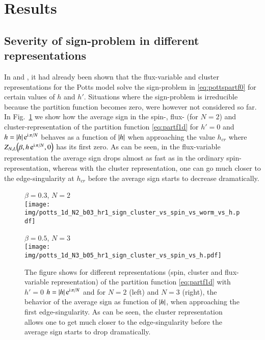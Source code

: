 \documentclass[epj]{webofc}
\let\originalleft\left
\let\originalright\right
\renewcommand{\left}{\mathopen{}\mathclose\bgroup\originalleft}
\renewcommand{\right}{\aftergroup\egroup\originalright}
\newcommand{\e}{\operatorname{e}}
\newcommand{\of}[1]{\left(#1\right)}
\newcommand{\ii}{\mathrm{i}}
\newcommand{\abs}[1]{\left| #1\right|}
\renewcommand*\[{\begin{equation}}
\renewcommand*\]{\end{equation}}
\begin{document}
\section{Results}\label{sec:results}

\subsection{Severity of sign-problem in different representations}\label{ssec:severityofsignproblem}
In \cite{Akerlund:2016myr} and \cite{Alford:2001ug}, it had already been shown that the flux-variable and cluster representations for the Potts model solve the sign-problem in \eqref{eq:pottspartf0} for certain values of $h$ and $h'$. Situations where the sign-problem is irreducible because the partition function becomes zero, were however not considered so far. In Fig.~\ref{fig:signproblemdiffrep1d} we show how the average sign in the spin-, flux- (for $N=2$) and cluster-representation of the partition function \eqref{eq:partf1d} for $h'=0$ and $h=\abs{h}\e^{\ii\,\pi/N}$ behaves as a function of $\abs{h}$ when approaching the value $h_{cr}$ where $Z_{N,L}\of{\beta,h\e^{\ii\,\pi/N},0}$ has its first zero. As can be seen, in the flux-variable representation the average sign drops almost as fast as in the ordinary spin-representation, whereas with the cluster representation, one can go much closer to the edge-singularity at $h_{cr}$ before the average sign starts to decrease dramatically.

\begin{figure}[h]
\centering
\begin{minipage}[t]{0.45\linewidth}
\centering
$\beta=0.3$, $N=2$\\[-5pt]
\texttt{[image: img/potts\_1d\_N2\_b03\_hr1\_sign\_cluster\_vs\_spin\_vs\_worm\_vs\_h.pdf]}
\end{minipage}\hfill
\begin{minipage}[t]{0.45\linewidth}
\centering
$\beta=0.5$, $N=3$\\[-5pt]
\texttt{[image: img/potts\_1d\_N3\_b05\_hr1\_sign\_cluster\_vs\_spin\_vs\_h.pdf]}
\end{minipage}
\caption{The figure shows for different representations (spin, cluster and flux-variable representation) of the partition function \eqref{eq:partf1d} with $h'=0$ $h=\abs{h}\e^{\ii\,\pi/N}$ and for $N=2$ (left) and $N=3$ (right), the behavior of the average sign as function of $\abs{h}$, when approaching the first edge-singularity. As can be seen, the cluster representation allows one to get much closer to the edge-singularity before the average sign starts to drop dramatically.}
\label{fig:signproblemdiffrep1d}
\end{figure}
\end{document}
